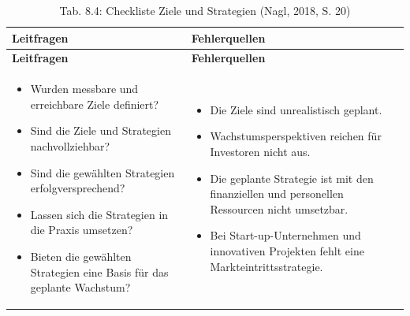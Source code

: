 \documentclass[
  letterpaper,
]{book}
\begin{document}
\begin{longtable}[]{@{}
  >{\raggedright\arraybackslash}p{}
  >{\raggedright\arraybackslash}p{}@{}}
\caption{Tab. 8.4: Checkliste Ziele und Strategien (Nagl, 2018, S.
20)}\tabularnewline
\toprule\noalign{}
\begin{minipage}[b]{\linewidth}\raggedright
\textbf{Leitfragen}
\end{minipage} & \begin{minipage}[b]{\linewidth}\raggedright
\textbf{Fehlerquellen}
\end{minipage} \\
\midrule\noalign{}
\endfirsthead
\toprule\noalign{}
\begin{minipage}[b]{\linewidth}\raggedright
\textbf{Leitfragen}
\end{minipage} & \begin{minipage}[b]{\linewidth}\raggedright
\textbf{Fehlerquellen}
\end{minipage} \\
\midrule\noalign{}
\endhead
\bottomrule\noalign{}
\endlastfoot
\begin{minipage}[t]{\linewidth}\raggedright
\begin{itemize}
\item
  Wurden messbare und erreichbare Ziele definiert?
\item
  Sind die Ziele und Strategien nachvollziehbar?
\item
  Sind die gewählten Strategien erfolgversprechend?
\item
  Lassen sich die Strategien in die Praxis umsetzen?
\item
  Bieten die gewählten Strategien eine Basis für das geplante Wachstum?
\end{itemize}
\end{minipage} & \begin{minipage}[t]{\linewidth}\raggedright
\begin{itemize}
\item
  Die Ziele sind unrealistisch geplant.
\item
  Wachstumsperspektiven reichen für Investoren nicht aus.
\item
  Die geplante Strategie ist mit den finanziellen und personellen
  Ressourcen nicht umsetzbar.
\item
  Bei Start-up-Unternehmen und innovativen Projekten fehlt eine
  Markteintrittsstrategie.
\end{itemize}
\end{minipage} \\
\end{longtable}
\end{document}
